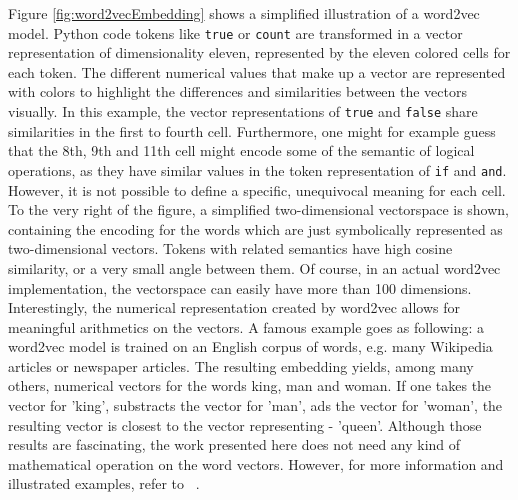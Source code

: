 \documentclass[
	a4paper,
	pagesize,
	pdftex,
	12pt,
	twoside, %
	BCOR=5mm, %
	ngerman,
	fleqn,
	final,
	]{scrartcl}
\begin{document}
Figure \ref{fig:word2vecEmbedding} shows a simplified illustration of a word2vec model. Python code tokens like \texttt{true} or \texttt{count} are transformed in a vector representation of dimensionality eleven, represented by the eleven colored cells for each token. The different numerical values that make up a vector are represented with colors to highlight the differences and similarities between the vectors visually. In this example, the vector representations of \texttt{true} and \texttt{false} share similarities in the first to fourth cell. Furthermore, one might for example guess that the 8th, 9th and 11th cell might encode some of the semantic of logical operations, as they have similar values in the token representation of \texttt{if} and \texttt{and}. However, it is not possible to define a specific, unequivocal meaning for each cell.\\
To the very right of the figure, a simplified two-dimensional vectorspace is shown, containing the encoding for the words which are just symbolically represented as two-dimensional vectors. Tokens with related semantics have high cosine similarity, or a very small angle between them. Of course, in an actual word2vec implementation, the vectorspace can easily have more than 100 dimensions.\\
Interestingly, the numerical representation created by word2vec allows for meaningful arithmetics on the vectors. A famous example goes as following: a word2vec model is trained on an English corpus of words, e.g. many Wikipedia articles or newspaper articles. The resulting embedding yields, among many others, numerical vectors for the words king, man and woman. If one takes the vector for 'king', substracts the vector for 'man', ads the vector for 'woman', the resulting vector is closest to the vector representing - 'queen'. Although those results are fascinating, the work presented here does not need any kind of mathematical operation on the word vectors. However, for more information and illustrated examples, refer to ~\cite{Word2Vec}.
\end{document}
